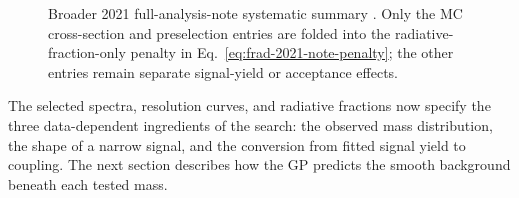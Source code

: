 \begin{figure}[H]
\centering
{}
\caption{Broader 2021 full-analysis-note systematic summary
\cite{HPS2021FullAnalysisNote}. Only the MC cross-section and preselection entries
are folded into the radiative-fraction-only penalty in
Eq.~\eqref{eq:frad-2021-note-penalty}; the other entries remain separate signal-yield
or acceptance effects.}
\label{fig:2021-syst-table-note}
\end{figure}

The selected spectra, resolution curves, and radiative fractions now specify the three
data-dependent ingredients of the search: the observed mass distribution, the shape of
a narrow signal, and the conversion from fitted signal yield to coupling. The next
section describes how the GP predicts the smooth background beneath each tested mass.

